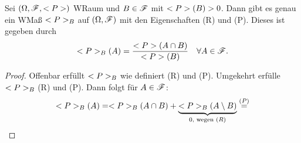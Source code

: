 \begin{lemma}
	Sei $(\Omega, \mathscr{F}, <P>)$ WRaum und $B \in \mathscr{F}$ mit $<P>(B) > 0$. Dann gibt es genau ein WMaß $<P>_B$ auf $(\Omega, \mathscr{F})$ mit den Eigenschaften (R) und (P). Dieses ist gegeben durch
	\begin{align}
		<P>_{B}(A) = \frac{<P>(A\cap B)}{<P>(B)} \quad \forall A \in \mathscr{F}.\notag
	\end{align}
\end{lemma}

\begin{proof}
	Offenbar erfüllt $<P>_{B}$ wie definiert (R) und (P). Umgekehrt erfülle $<P>_{B}$ (R) und (P). Dann folgt für $A \in \mathscr{F}$:
	\begin{align}
		<P>_{B}(A) = <P>_{B}(A\cap B) + \underbrace{<P>_{B}(A\setminus B)}_{0, \text{ wegen } (R)} \overset{(P)}{=}
	\end{align}
\end{proof}